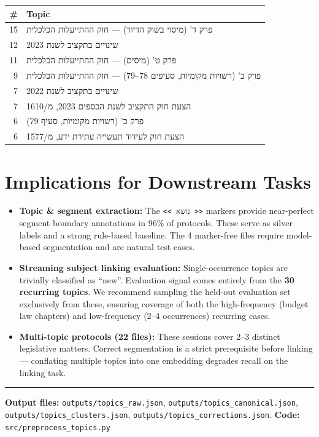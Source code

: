 \documentclass[11pt,a4paper]{article}
\begin{document}
\begin{center}
\begin{tabular}{rl}
\toprule
\textbf{\#} & \textbf{Topic} \\
\midrule
15 & \texthebrew{פרק ד' (מיסוי בשוק הדיור) --- חוק ההתייעלות הכלכלית} \\
12 & \texthebrew{שינויים בתקציב לשנת 2023} \\
11 & \texthebrew{פרק ט' (מיסים) --- חוק ההתייעלות הכלכלית} \\
9  & \texthebrew{פרק כ' (רשויות מקומיות, סעיפים 78--79) --- חוק ההתייעלות הכלכלית} \\
7  & \texthebrew{שינויים בתקציב לשנת 2022} \\
7  & \texthebrew{הצעת חוק התקציב לשנת הכספים 2023, מ/1610} \\
6  & \texthebrew{פרק כ' (רשויות מקומיות, סעיף 79)} \\
6  & \texthebrew{הצעת חוק לעידוד תעשייה עתירת ידע, מ/1577} \\
\bottomrule
\end{tabular}
\end{center}

\section{Implications for Downstream Tasks}

\begin{itemize}
  \item \textbf{Topic \& segment extraction:} The \texttt{<{}< נושא >{}>} markers provide
    near-perfect segment boundary annotations in 96\% of protocols. These serve as
    silver labels and a strong rule-based baseline. The 4 marker-free files require
    model-based segmentation and are natural test cases.

  \item \textbf{Streaming subject linking evaluation:} Single-occurrence topics are
    trivially classified as ``new''. Evaluation signal comes entirely from the
    \textbf{30 recurring topics}. We recommend sampling the held-out evaluation set
    exclusively from these, ensuring coverage of both the high-frequency
    (budget law chapters) and low-frequency (2--4 occurrences) recurring cases.

  \item \textbf{Multi-topic protocols (22 files):} These sessions cover 2--3 distinct
    legislative matters. Correct segmentation is a strict prerequisite before linking ---
    conflating multiple topics into one embedding degrades recall on the linking task.
\end{itemize}

\vspace{2em}
\hrule
\vspace{0.5em}
{\small
\textbf{Output files:}
\texttt{outputs/topics\_raw.json},
\texttt{outputs/topics\_canonical.json},
\texttt{outputs/topics\_clusters.json},
\texttt{outputs/topics\_corrections.json}.
\textbf{Code:} \texttt{src/preprocess\_topics.py}
}
\end{document}
